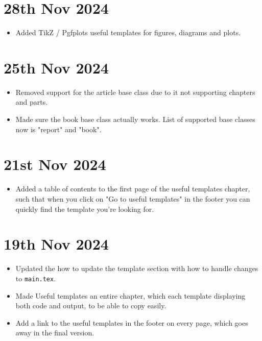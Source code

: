 \section*{28th Nov 2024} \label{sec:changelog:2024/11/28}
\begin{itemize}
    \item Added TikZ / Pgfplots useful templates for figures, diagrams and plots.
\end{itemize}

\section*{25th Nov 2024} \label{sec:changelog:2024/11/25}
\begin{itemize}
    \item Removed support for the article base class due to it not supporting chapters and parts.
    \item Made sure the book base class actually works. List of supported base classes now is "report" and "book".
\end{itemize}

\section*{21st Nov 2024} \label{sec:changelog:2024/11/21}
\begin{itemize}
    \item Added a table of contents to the first page of the useful templates chapter, such that when you click on "Go to useful templates" in the footer you can quickly find the template you're looking for.
\end{itemize}

\section*{19th Nov 2024} \label{sec:changelog:2024/11/19}
\begin{itemize}
    \item Updated the how to update the template section with how to handle changes to \verb|main.tex|.
    \item Made Useful templates an entire chapter, which each template displaying both code and output, to be able to copy easily.
    \item Add a link to the useful templates in the footer on every page, which goes away in the final version.
\end{itemize}

